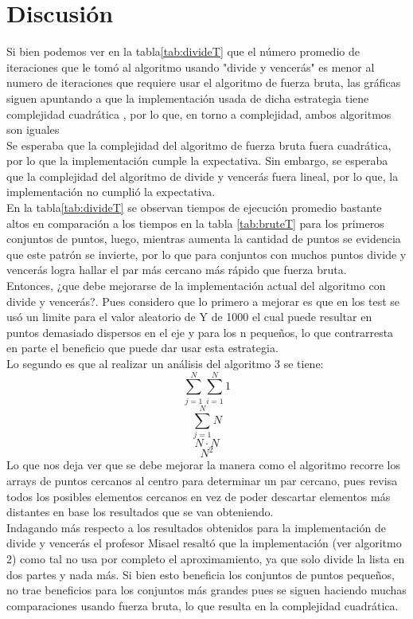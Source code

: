 \section{Discusión}
Si bien podemos ver en la tabla\ref{tab:divideT} que el número promedio de iteraciones que le tomó al algoritmo usando "divide y vencerás" es menor al numero de iteraciones que requiere usar el algoritmo de fuerza bruta, las gráficas siguen apuntando a que la implementación usada de dicha estrategia tiene complejidad cuadrática , por lo que, en torno a complejidad, ambos algoritmos son iguales\\

Se esperaba que la complejidad del algoritmo de fuerza bruta fuera cuadrática, por lo que la implementación cumple la expectativa. Sin embargo, se esperaba que la complejidad del algoritmo de divide y vencerás fuera lineal, por lo que, la implementación no cumplió la expectativa.\\

En la tabla\ref{tab:divideT} se observan tiempos de ejecución promedio bastante altos en comparación a los tiempos en la tabla \ref{tab:bruteT} para los primeros conjuntos de puntos, luego, mientras aumenta la cantidad de puntos se evidencia que este patrón se invierte, por lo que para conjuntos con muchos puntos divide y vencerás logra hallar el par más cercano más rápido que fuerza bruta.\\

Entonces, ¿que debe mejorarse de la implementación actual del algoritmo con divide y vencerás?. Pues considero que lo primero a mejorar es que en los test se usó un limite para el valor aleatorio de Y de 1000 el cual puede resultar en puntos demasiado dispersos en el eje y para los n pequeños, lo que contrarresta en parte el beneficio que puede dar usar esta estrategia.\\

Lo segundo es que al realizar un análisis del algoritmo 3 se tiene:\\
$$\sum_{j = 1}^{N}\sum_{i=1}^{N}1$$
$$\sum_{j = 1}^{N}N$$
$$N \cdot N$$
$$N^2$$
Lo que nos deja ver que se debe mejorar la manera como el algoritmo recorre los arrays de puntos cercanos al centro para determinar un par cercano, pues revisa todos los posibles elementos cercanos en vez de poder descartar elementos más distantes en base los resultados que se van obteniendo.\\

Indagando más respecto a los resultados obtenidos para la implementación de divide y vencerás el profesor Misael resaltó que la implementación  (ver algoritmo 2) como tal no usa por completo el aproximamiento, ya que solo divide la lista en dos partes y nada más. Si bien esto beneficia los conjuntos de puntos pequeños, no trae beneficios para los conjuntos más grandes pues se siguen haciendo muchas comparaciones usando fuerza bruta, lo que resulta en la complejidad cuadrática.\\



